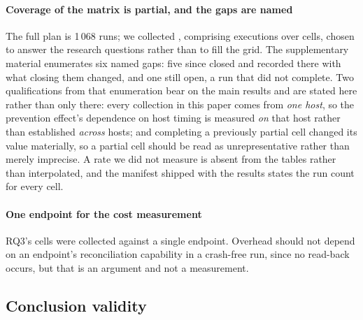\paragraph{Coverage of the matrix is partial, and the gaps are named} The full
plan is 1\,068 runs; we collected \RunsCollected{}, comprising
\ExecutionsCollected{} executions over \CellsCollected{} cells, chosen to answer
the research questions rather than to fill the grid.
The supplementary material enumerates six named gaps: five since closed and
recorded there with what closing them changed, and one still open, a run that
did not complete.
Two qualifications from that enumeration bear on the main results
and are stated here rather than only there: every collection in this paper comes
from \emph{one host}, so the prevention effect's dependence on host timing is
measured \emph{on} that host rather than established \emph{across} hosts; and
completing a previously partial cell changed its value materially, so a partial
cell should be read as unrepresentative rather than merely imprecise. A rate we
did not measure is absent from the tables rather than interpolated, and the
manifest shipped with the results states the run count for every cell.

\paragraph{One endpoint for the cost measurement} RQ3's cells were collected
against a single endpoint. Overhead should not depend on an endpoint's
reconciliation capability in a crash-free run, since no read-back occurs, but
that is an argument and not a measurement.

\subsection{Conclusion validity}

